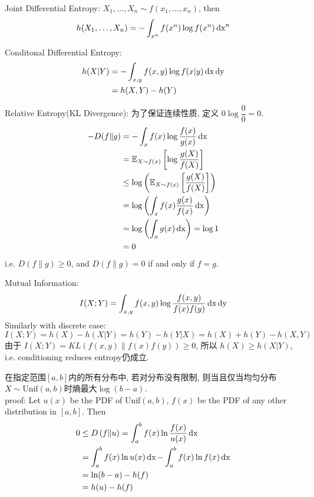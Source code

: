 \begin{definition}
Joint Differential Entropy: $X_1,\ldots,X_n\sim f(x_1,\ldots,x_n)$, then
$$h(X_1,\ldots,X_n)=-\int_{x^n} f(x^n)\log f(x^n) \operatorname{dx}^n$$
\end{definition}

\begin{definition}
Conditonal Differential Entropy:
\begin{align*}
h(X|Y) &= -\int_{x,y} f(x,y)\log f(x|y) \operatorname{dx} \operatorname{dy} \\
&= h(X,Y)-h(Y)
\end{align*}
\end{definition}

\begin{definition}
Relative Entropy(KL Divergence): 为了保证连续性质, 定义 $0\log\dfrac{0}{0}=0$.
\begin{align*}
-D(f\|g) &= -\int_x f(x)\log \dfrac{f(x)}{g(x)} \operatorname{dx} \\
&= \mathbb{E}_{X\sim f(x)}\left[\log \dfrac{g(X)}{f(X)}\right] \\
&\leq \log \left(\mathbb{E}_{X\sim f(x)}\left[\dfrac{g(X)}{f(X)}\right]\right) \\
&= \log \left(\int_x f(x) \dfrac{g(x)}{f(x)} \operatorname{dx}\right) \\
&= \log \left(\int_x g(x) \operatorname{dx}\right) = \log 1 \\
&= 0
\end{align*}
i.e. $D(f\|g)\geq 0$, and $D(f\|g)=0$ if and only if $f=g$.
\end{definition}

\begin{definition}
Mutual Information:
$$I(X;Y)=\int_{x,y} f(x,y)\log \dfrac{f(x,y)}{f(x)f(y)} \operatorname{dx} \operatorname{dy} $$
Similarly with discrete case:
$$I(X;Y)=h(X)-h(X|Y)=h(Y)-h(Y|X)=h(X)+h(Y)-h(X,Y)$$
由于 $I(X;Y) = KL(f(x,y)\|f(x)f(y)) \geq 0$, 所以 $h(X) \geq h(X|Y)$, i.e. conditioning reduces entropy仍成立.
\end{definition}

\begin{proposition}
在指定范围$[a,b]$内的所有分布中, 若对分布没有限制, 则当且仅当均匀分布$X\sim \text{Unif}(a,b)$时熵最大$\log (b-a)$. \\
proof: Let $u(x)$ be the PDF of Unif$(a,b)$, $f(x)$ be the PDF of any other distribution in $[a,b]$. Then
\begin{align*}
0 &\leq D\left(f\|u\right) = \int_{a}^{b}f(x)\ln \dfrac{f(x)}{u(x)} \operatorname{dx} \\
&= \int_{a}^{b}f(x)\ln u(x) \operatorname{dx} - \int_{a}^{b}f(x)\ln f(x) \operatorname{dx} \\
&= \ln(b-a) - h(f) \\
&= h(u) - h(f)
\end{align*}
\end{proposition}

